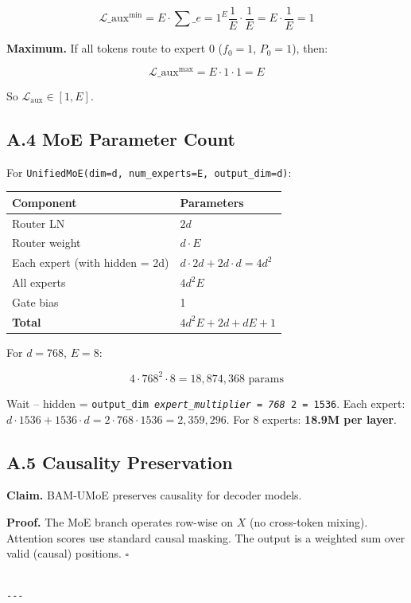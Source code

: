 \[
\mathcal{L}\_\text{aux}^\text{min} = E \cdot \sum\_{e=1}^{E} \frac{1}{E} \cdot \frac{1}{E} = E \cdot \frac{1}{E} = 1
\]

\textbf{Maximum.} If all tokens route to expert 0 ($f_0 = 1$, $P_0 = 1$), then:

\[
\mathcal{L}\_\text{aux}^\text{max} = E \cdot 1 \cdot 1 = E
\]

So $\mathcal{L}_\text{aux} \in [1, E]$.

\subsection{A.4 MoE Parameter Count}

For \texttt{UnifiedMoE(dim=d, num\_experts=E, output\_dim=d)}:

\begin{table}[H]
\centering
\small
\begin{tabular}{ll}
\toprule
\textbf{Component} & \textbf{Parameters} \\
\midrule
Router LN & $2d$ \\
Router weight & $d \cdot E$ \\
Each expert (with hidden = 2d) & $d \cdot 2d + 2d \cdot d = 4d^2$ \\
All experts & $4d^2 E$ \\
Gate bias & 1 \\
\textbf{Total} & $4d^2 E + 2d + dE + 1$ \\
\bottomrule
\end{tabular}
\end{table}

For $d = 768$, $E = 8$: 

\[
4 \cdot 768^2 \cdot 8 = 18{,}874{,}368 \text{ params}
\]

Wait -- hidden = \texttt{output\_dim \textit{ expert\_multiplier = 768 } 2 = 1536}. Each 
expert: $d \cdot 1536 + 1536 \cdot d = 2 \cdot 768 \cdot 1536 = 2{,}359{,}296$. 
For 8 experts: \textbf{18.9M per layer}.

\subsection{A.5 Causality Preservation}

\textbf{Claim.} BAM-UMoE preserves causality for decoder models.

\textbf{Proof.} The MoE branch operates row-wise on $X$ (no cross-token mixing). 
Attention scores use standard causal masking. The output is a weighted sum 
over valid (causal) positions. $\square$
\begin{lstlisting}

---
\end{lstlisting}

